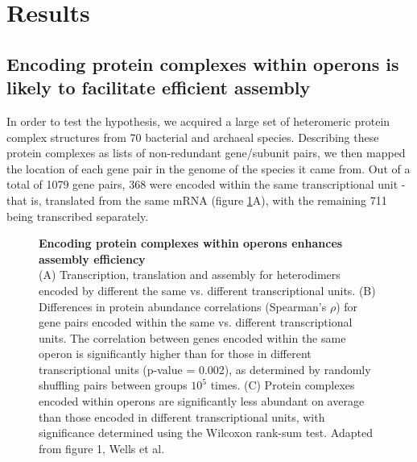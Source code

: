 \documentclass[a4paper,11pt,twoside,openright]{scrbook}
\begin{document}
\section{Results}
\subsection{Encoding protein complexes within operons is likely to facilitate efficient assembly}
In order to test the hypothesis, we acquired a large set of heteromeric protein complex structures from 70 bacterial and archaeal species. Describing these protein complexes as lists of non-redundant gene/subunit pairs, we then mapped the location of each gene pair in the genome of the species it came from. Out of a total of 1079 gene pairs, 368 were encoded within the same transcriptional unit - that is, translated from the same mRNA (figure \ref{figure:operonabundance}A), with the remaining 711 being transcribed separately.

\begin{figure}
    \caption[Encoding protein complexes within operons enhances assembly efficiency]{\sffamily \textbf{Encoding protein complexes within operons enhances assembly efficiency} \\ \small (A) Transcription, translation and assembly for heterodimers encoded by different the same vs. different transcriptional units. (B) Differences in protein abundance correlations (Spearman's \(\rho\)) for gene pairs encoded within the same vs. different transcriptional units. The correlation between genes encoded within the same operon is significantly higher than for those in different transcriptional units (p-value = 0.002), as determined by randomly shuffling pairs between groups \(10^{5}\) times. (C) Protein complexes encoded within operons are significantly less abundant on average than those encoded in different transcriptional units, with significance determined using the Wilcoxon rank-sum test. Adapted from figure 1, Wells et al. \cite{Wells2016}}
    \label{figure:operonabundance}
\end{figure}
\end{document}
